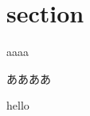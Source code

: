 \documentclass[a4paper]{jsarticle}
\begin{document}
\section{section}
aaaa

ああああ

hello
\end{document}
